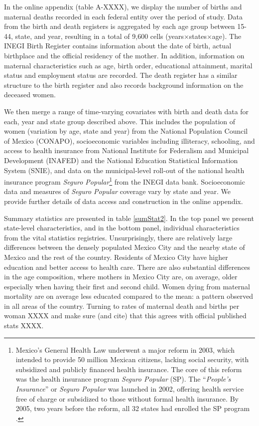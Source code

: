 \documentclass[a4paper, 11pt]{article}
\begin{document}
\begin{spacing}{2}
In the online appendix (table A-XXXX), we display the number of births and maternal deaths recorded in each federal entity over the period of study. Data from the birth and death registers is aggregated by each age group between 15-44, state, and year, resulting in a total of 9,600 cells (years$\times$states$\times$age). The INEGI Birth Register contains information about the date of birth, actual birthplace and the official residency of the mother. In addition, information on maternal characteristics such as age, birth order, educational attainment, marital status and employment status are recorded. The death register has a similar structure to the birth register and also records background information on the deceased women.

We then merge a range of time-varying covariates with birth and death data for each, year and state group described above.  This includes the population of women (variation by age, state and year) from the National Population Council of Mexico (CONAPO), socioeconomic variables including illiteracy, schooling, and access to health insurance from National Institute for Federalism and Municipal Development (INAFED) and the National Education Statistical Information System (SNIE), and data on the municipal-level roll-out of the national health insurance program \emph{Seguro Popular}\footnote{Mexico's General Health Law underwent a major reform in 2003, which intended to provide 50 million Mexican citizens, lacking social security, with subsidized and publicly financed health insurance. The core of this reform was the health insurance program \textit{Seguro Popular} (SP). The ``\textit{People’s Insurance}'' or \textit{Seguro Popular} was launched in 2002, offering health service free of charge or subsidized to those without formal health insurance. By 2005, two years before the reform, all 32 states had enrolled the SP program \citep{Knauletal2007}.} from the INEGI data bank.  Socioeconomic data and measures of \emph{Seguro Popular} coverage vary by state and year.  We provide further details of data access and construction in the online appendix.

Summary statistics are presented in table \ref{sumStat2}.  In the top panel we present state-level characteristics, and in the bottom panel, individual characteristics from the vital statistics registries.  Unsurprisingly, there are relatively large differences between the densely populated Mexico City and the nearby state of Mexico and the rest of the country.  Residents of Mexico City have higher education and better access to health care. There are also substantial differences in the age composition, where mothers in Mexico City are, on average, older especially when having their first and second child.  Women dying from maternal mortality are on average less educated compared to the mean: a pattern observed in all areas of the country.  Turning to rates of maternal death and births per woman XXXX and make sure (and cite) that this agrees with official published stats XXXX.


\end{spacing}
\end{document}
